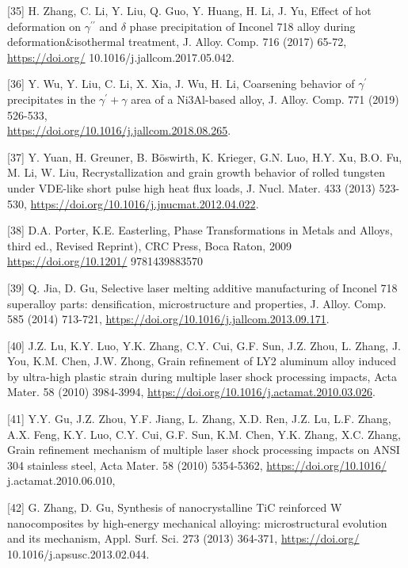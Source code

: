 \documentclass[10pt]{article}
\begin{document}
[35] H. Zhang, C. Li, Y. Liu, Q. Guo, Y. Huang, H. Li, J. Yu, Effect of hot deformation on $\gamma^{\prime \prime}$ and $\delta$ phase precipitation of Inconel 718 alloy during deformation\&isothermal treatment, J. Alloy. Comp. 716 (2017) 65-72, \href{https://doi.org/}{https://doi.org/} 10.1016/j.jallcom.2017.05.042.

[36] Y. Wu, Y. Liu, C. Li, X. Xia, J. Wu, H. Li, Coarsening behavior of $\gamma^{\prime}$ precipitates in the $\gamma^{\prime}+\gamma$ area of a Ni3Al-based alloy, J. Alloy. Comp. 771 (2019) 526-533,\\
\href{https://doi.org/10.1016/j.jallcom.2018.08.265}{https://doi.org/10.1016/j.jallcom.2018.08.265}.

[37] Y. Yuan, H. Greuner, B. Böswirth, K. Krieger, G.N. Luo, H.Y. Xu, B.O. Fu, M. Li, W. Liu, Recrystallization and grain growth behavior of rolled tungsten under VDE-like short pulse high heat flux loads, J. Nucl. Mater. 433 (2013) 523-530, \href{https://doi.org/10.1016/j.jnucmat.2012.04.022}{https://doi.org/10.1016/j.jnucmat.2012.04.022}.

[38] D.A. Porter, K.E. Easterling, Phase Transformations in Metals and Alloys, third ed., Revised Reprint), CRC Press, Boca Raton, 2009 \href{https://doi.org/10.1201/}{https://doi.org/10.1201/} 9781439883570

[39] Q. Jia, D. Gu, Selective laser melting additive manufacturing of Inconel 718 superalloy parts: densification, microstructure and properties, J. Alloy. Comp. 585 (2014) 713-721, \href{https://doi.org/10.1016/j.jallcom.2013.09.171}{https://doi.org/10.1016/j.jallcom.2013.09.171}.

[40] J.Z. Lu, K.Y. Luo, Y.K. Zhang, C.Y. Cui, G.F. Sun, J.Z. Zhou, L. Zhang, J. You, K.M. Chen, J.W. Zhong, Grain refinement of LY2 aluminum alloy induced by ultra-high plastic strain during multiple laser shock processing impacts, Acta Mater. 58 (2010) 3984-3994, \href{https://doi.org/10.1016/j.actamat.2010.03.026}{https://doi.org/10.1016/j.actamat.2010.03.026}.

[41] Y.Y. Gu, J.Z. Zhou, Y.F. Jiang, L. Zhang, X.D. Ren, J.Z. Lu, L.F. Zhang, A.X. Feng, K.Y. Luo, C.Y. Cui, G.F. Sun, K.M. Chen, Y.K. Zhang, X.C. Zhang, Grain refinement mechanism of multiple laser shock processing impacts on ANSI 304 stainless steel, Acta Mater. 58 (2010) 5354-5362, \href{https://doi.org/10.1016/}{https://doi.org/10.1016/} j.actamat.2010.06.010,

[42] G. Zhang, D. Gu, Synthesis of nanocrystalline TiC reinforced W nanocomposites by high-energy mechanical alloying: microstructural evolution and its mechanism, Appl. Surf. Sci. 273 (2013) 364-371, \href{https://doi.org/}{https://doi.org/} 10.1016/j.apsusc.2013.02.044.
\end{document}
